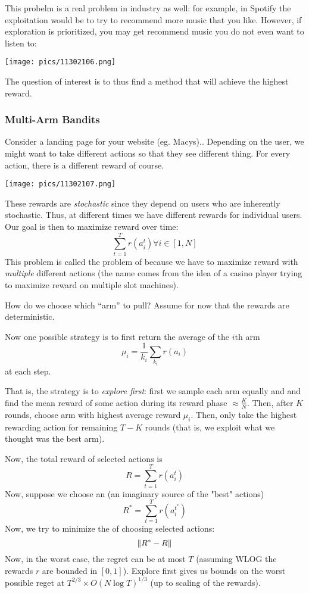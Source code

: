 \documentclass[11pt]{scrartcl}
\begin{document}
This probelm is a real problem in industry as well: for example, in Spotify the exploitation would be to try to recommend more music that you like. However, if exploration is prioritized, you may get recommend music you do not even want to listen to: 
\begin{center}
    \texttt{[image: pics/11302106.png]}
\end{center}

The question of interest is to thus find a method that will achieve the highest reward. 
\subsubsection{Multi-Arm Bandits}
Consider a landing page for your website (eg. Macys).. Depending on the user, we might want to take different actions so that they see different thing. For every action, there is a different reward of course.
\begin{center}
    \texttt{[image: pics/11302107.png]}
\end{center}
These rewards are \textit{stochastic} since they depend on users who are inherently stochastic. Thus, at different times we have different rewards for individual users. Our goal is then to maximize reward over time: 
$$\sum_{t=1}^{T}r(a_i^{t}) \forall{i} \in [1,N]$$
This problem is called the problem of  because we have to maximize reward with \textit{multiple} different actions (the name comes from the idea of a casino player trying to maximize reward on multiple slot machines).

How do we choose which ``arm'' to pull? Assume for now that the rewards are deterministic.

Now one possible strategy is to first return the average of the $i$th arm $$\mu_i = \frac{1}{k_i}\sum_{k_i}r(a_i)$$ at each step. 

That is, the strategy is to \textit{explore first}: first we sample each arm equally and and find the mean reward of some action during its reward phase $\approx \frac{K}{N}$. Then, after $K$ rounds, choose arm with highest average reward $\mu_i$. Then, only take the highest rewarding action for remaining $T-K$ rounds (that is, we exploit what we thought was the best arm). 

Now, the total reward of selected actions is $$R=\sum_{t=1}^{T}r(a_i^{t})$$
Now, suppose we choose an  (an imaginary source of the "best" actions) $$R^*=\sum_{t=1}^{T}r(a_i^{t^*})$$
Now, we try to minimize the  of choosing selected actions: $$\left\lVert R^*-R\right\rVert$$
Now, in the worst case, the regret can be at most $T$ (assuming WLOG the rewards $r$ are bounded in $[0,1]$). Explore first gives us bounds on the worst possible reget at $T^{2/3}\times O(N\log{T})^{1/3}$ (up to scaling of the rewards). 
\end{document}
